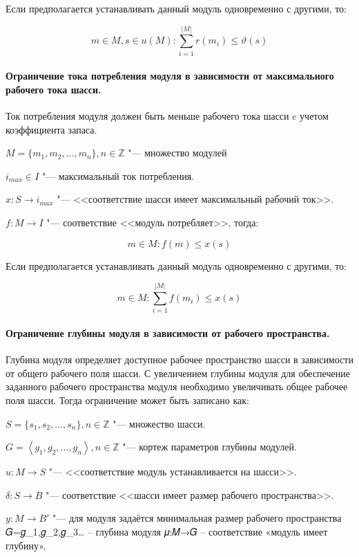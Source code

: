 Если предполагается устанавливать данный модуль одновременно с другими, то:

\[
m \in M, s \in u(M): \sum_{i=1}^{|M|}r(m_i) \leq \vartheta(s)
\]

\paragraph{Ограничение тока потребления модуля в зависимости от максимального рабочего тока шасси.} Ток потребления модуля должен быть меньше рабочего тока шасси c учетом коэффициента запаса.

\noindent $M = \{m_1, m_2, \ldots, m_n\}, n \in \mathbb{Z} $ "--- множество модулей

\noindent $i_{max} \in I$ "--- максимальный ток потребления.

\noindent $x: S \rightarrow i_{max}$ "--- <<соответствие шасси имеет максимальный рабочий ток>>.

\noindent $f: M \rightarrow I$ "--- соответствие <<модуль потребляет>>, тогда:

\[
m \in M: f(m) \leq x(s)
\]

Если предполагается устанавливать данный модуль одновременно с другими, то:

\[
m \in M: \sum_{i=1}^{|M|}f(m_i) \leq x(s)
\]


\paragraph{Ограничение глубины модуля в зависимости от рабочего пространства.} Глубина модуля определяет доступное рабочее пространство шасси в зависимости от общего рабочего поля шасси. С увеличением глубины модуля для обеспечение заданного рабочего пространства модуля необходимо увеличивать общее рабочее поля шасси. Тогда ограничение может быть записано как:

\noindent $S = \{s_1, s_2, \ldots, s_n\}, n \in \mathbb{Z} $ "--- множество шасси.

\noindent $G = \left \langle g_1, g_2, \ldots, g_n\right \rangle, n \in \mathbb{Z} $ "--- кортеж параметров глубины модулей.

\noindent $u: M \rightarrow S$ "--- <<соответствие модуль устанавливается на шасси>>.

\noindent $\delta: S \rightarrow B$ "--- соответствие <<шасси имеет размер рабочего пространства>>.

\noindent $y: M \rightarrow B'$ "--- для модуля задаётся минимальная размер рабочего пространства 
𝐺={𝑔_1,𝑔_2,𝑔_3…}  –  глубина модуля
𝜇:𝑀→𝐺 – соответствие «модуль имеет глубину»,
 


